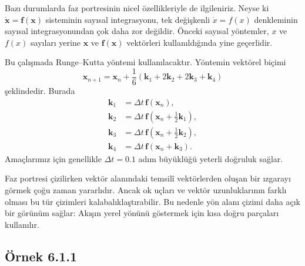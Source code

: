 \begin{justify}
Bazı durumlarda faz portresinin nicel özellikleriyle de ilgileniriz. Neyse ki $\dot{\mathbf{x}}=\mathbf{f}(\mathbf{x})$ sisteminin sayısal integrasyonu, tek değişkenli $\dot{x}=f(x)$ denkleminin sayısal integrasyonundan çok daha zor değildir. Önceki sayısal yöntemler, $x$ ve $f(x)$ sayıları yerine $\mathbf{x}$ ve $\mathbf{f}(\mathbf{x})$ vektörleri kullanıldığında yine geçerlidir.

Bu çalışmada Runge--Kutta yöntemi kullanılacaktır. Yöntemin vektörel biçimi
\begin{equation}
\mathbf{x}_{n+1}=\mathbf{x}_n+\frac{1}{6}\left(\mathbf{k}_1+2\mathbf{k}_2+2\mathbf{k}_3+\mathbf{k}_4\right)
\end{equation}
şeklindedir. Burada
\begin{align}
\mathbf{k}_1 &= \Delta t\,\mathbf{f}(\mathbf{x}_n),\\
\mathbf{k}_2 &= \Delta t\,\mathbf{f}\left(\mathbf{x}_n+\frac{1}{2}\mathbf{k}_1\right),\\
\mathbf{k}_3 &= \Delta t\,\mathbf{f}\left(\mathbf{x}_n+\frac{1}{2}\mathbf{k}_2\right),\\
\mathbf{k}_4 &= \Delta t\,\mathbf{f}\left(\mathbf{x}_n+\mathbf{k}_3\right).
\end{align}
Amaçlarımız için genellikle $\Delta t=0.1$ adım büyüklüğü yeterli doğruluk sağlar.

Faz portresi çizilirken vektör alanındaki temsilî vektörlerden oluşan bir ızgarayı görmek çoğu zaman yararlıdır. Ancak ok uçları ve vektör uzunluklarının farklı olması bu tür çizimleri kalabalıklaştırabilir. Bu nedenle yön alanı çizimi daha açık bir görünüm sağlar: Akışın yerel yönünü göstermek için kısa doğru parçaları kullanılır.
\end{justify}

\subsection*{Örnek 6.1.1}
{}

